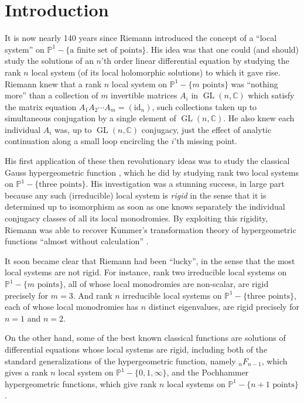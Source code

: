 \chapter*{Introduction}
{}
\label{chap:introduction}

It is now nearly 140 years since Riemann introduced \cite{Rie-EDL} the
concept of a ``local system'' on
\(\mathbb{P}^1-\{\text{a finite set of points}\}\). His idea was that one
could (and should) study the solutions of an \(n\)'th order linear
differential equation by studying the rank \(n\) local system (of its local
holomorphic solutions) to which it gave rise. Riemann knew that a rank
\(n\) local system on \(\mathbb{P}^1-\{m\text{ points}\}\) was ``nothing
more'' than a collection of \(m\) invertible matrices \(A_i\) in
\(\operatorname{GL}(n,\mathbb{C})\) which satisfy the matrix equation
\(A_1A_2\cdots A_m=(\mathrm{id}_n)\), such collections taken up to
simultaneous conjugation by a single element of
\(\operatorname{GL}(n,\mathbb{C})\). He also knew each individual \(A_i\)
was, up to \(\operatorname{GL}(n,\mathbb{C})\) conjugacy, just the effect
of analytic continuation along a small loop encircling the \(i\)'th missing
point.

His first application of these then revolutionary ideas was to study the
classical Gauss hypergeometric function \cite{Rie-SG}, which he did by
studying rank two local systems on \(\mathbb{P}^1-\{\text{three points}\}\).
His investigation was a stunning success, in large part because any such
(irreducible) local system is \emph{rigid} in the sense that it is determined
up to isomorphism as soon as one knows separately the individual conjugacy
classes of all its local monodromies. By exploiting this rigidity, Riemann
was able to recover Kummer's transformation theory of hypergeometric
functions ``almost without calculation'' \cite{Rie-APM}.

It soon became clear that Riemann had been ``lucky'', in the sense that the
most local systems are not rigid. For instance, rank two irreducible local
systems on \(\mathbb{P}^1-\{m\text{ points}\}\), all of whose local
monodromies are non-scalar, are rigid precisely for \(m=3\). And rank \(n\)
irreducible local systems on \(\mathbb{P}^1-\{\text{three points}\}\), each
of whose local monodromies has \(n\) distinct eigenvalues, are rigid
precisely for \(n=1\) and \(n=2\).

On the other hand, some of the best known classical functions are solutions
of differential equations whose local systems are rigid, including both of
the standard generalizations of the hypergeometric function, namely
\({}_nF_{n-1}\), which gives a rank \(n\) local system on
\(\mathbb{P}^1-\{0,1,\infty\}\), and the Pochhammer hypergeometric
functions, which give rank \(n\) local systems on
\(\mathbb{P}^1-\{n+1\text{ points}\}\).

